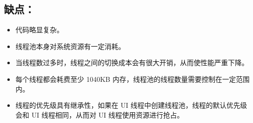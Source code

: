 \documentclass[9pt, b5paper]{article}
\begin{document}
\subsection{缺点：}
\label{sec-6-2}
\begin{itemize}
\item 代码略显复杂。
\item 线程池本身对系统资源有一定消耗。
\item 当线程数过多时，线程之间的切换成本会有很大开销，从而使性能严重下降。
\item 每个线程都会耗费至少 1040KB 内存，线程池的线程数量需要控制在一定范围内。
\item 线程的优先级具有继承性，如果在 UI 线程中创建线程池，线程的默认优先级会和 UI 线程相同，从而对 UI 线程使用资源进行抢占。
\end{itemize}
\end{document}
